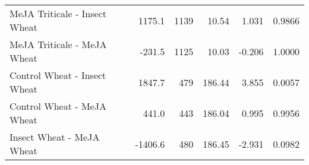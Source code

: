 \begin{table}[ht]
\begin{tabular}{lrrrrr}
        MeJA Triticale - Insect Wheat & 1175.1 &1139 & 10.54 & 1.031 & 0.9866 \\
        MeJA Triticale - MeJA Wheat & -231.5 &1125 & 10.03 & -0.206 & 1.0000 \\
        Control Wheat - Insect Wheat & 1847.7 & 479 & 186.44 & 3.855 & 0.0057 \\
        Control Wheat - MeJA Wheat & 441.0 & 443 & 186.04 & 0.995 & 0.9956 \\
        Insect Wheat - MeJA Wheat &-1406.6 & 480 & 186.45 & -2.931 & 0.0982 \\
    \end{tabular}
\end{table}